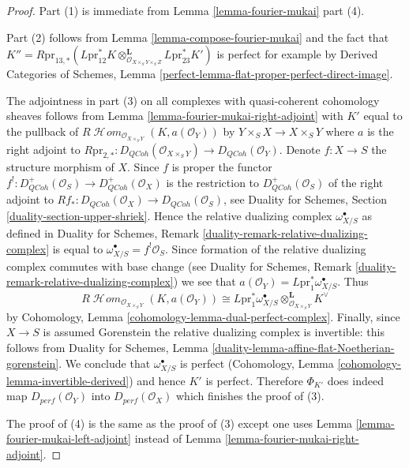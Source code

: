 \documentclass{stacks-project}
\theoremstyle{plain}
\theoremstyle{definition}
\theoremstyle{remark}
\numberwithin{equation}{subsection}
\def\SheafHom{\mathop{\mathcal{H}\!\mathit{om}}\nolimits}
\def\QCoh{\mathit{QCoh}}
\begin{document}
\begin{proof}
Part (1) is immediate from Lemma \ref{lemma-fourier-mukai} part (4).

\medskip\noindent
Part (2) follows from Lemma \ref{lemma-compose-fourier-mukai} and the
fact that
$K'' = R\text{pr}_{13, *}(
L\text{pr}_{12}^*K
\otimes_{\mathcal{O}_{X \times_S Y \times_S Z}}^\mathbf{L}
L\text{pr}_{23}^*K')$ is perfect for example by
Derived Categories of Schemes, Lemma
\ref{perfect-lemma-flat-proper-perfect-direct-image}.

\medskip\noindent
The adjointness in part (3) on all complexes with quasi-coherent cohomology
sheaves follows from Lemma \ref{lemma-fourier-mukai-right-adjoint} with
$K'$ equal to the pullback of
$R\SheafHom_{\mathcal{O}_{X \times_S Y}}(K, a(\mathcal{O}_Y))$
by $Y \times_S X \to X \times_S Y$ where $a$ is the right adjoint
to $R\text{pr}_{2, *} : D_\QCoh(\mathcal{O}_{X \times_S Y}) \to
D_\QCoh(\mathcal{O}_Y)$. Denote $f : X \to S$ the structure morphism of $X$.
Since $f$ is proper the functor
$f^! : D_\QCoh^+(\mathcal{O}_S) \to D_\QCoh^+(\mathcal{O}_X)$
is the restriction to $D_\QCoh^+(\mathcal{O}_S)$
of the right adjoint to
$Rf_* : D_\QCoh(\mathcal{O}_X) \to D_\QCoh(\mathcal{O}_S)$, see
Duality for Schemes, Section \ref{duality-section-upper-shriek}.
Hence the relative dualizing complex $\omega_{X/S}^\bullet$ as defined in
Duality for Schemes, Remark
\ref{duality-remark-relative-dualizing-complex}
is equal to $\omega_{X/S}^\bullet = f^!\mathcal{O}_S$.
Since formation of the relative dualizing complex
commutes with base change (see Duality for Schemes, Remark
\ref{duality-remark-relative-dualizing-complex}) we see that
$a(\mathcal{O}_Y) = L\text{pr}_1^*\omega_{X/S}^\bullet$.
Thus
$$
R\SheafHom_{\mathcal{O}_{X \times_S Y}}(K, a(\mathcal{O}_Y))
\cong
L\text{pr}_1^*\omega_{X/S}^\bullet
\otimes_{\mathcal{O}_{X \times_S Y}}^\mathbf{L} K^\vee
$$
by Cohomology, Lemma \ref{cohomology-lemma-dual-perfect-complex}.
Finally, since $X \to S$ is assumed Gorenstein the relative dualizing complex
is invertible: this follows from Duality for Schemes, Lemma
\ref{duality-lemma-affine-flat-Noetherian-gorenstein}.
We conclude that $\omega_{X/S}^\bullet$ is perfect
(Cohomology, Lemma \ref{cohomology-lemma-invertible-derived})
and hence $K'$ is perfect.
Therefore $\Phi_{K'}$ does indeed map $D_{perf}(\mathcal{O}_Y)$
into $D_{perf}(\mathcal{O}_X)$ which finishes the proof of (3).

\medskip\noindent
The proof of (4) is the same as the proof of (3) except one uses
Lemma \ref{lemma-fourier-mukai-left-adjoint} instead of
Lemma \ref{lemma-fourier-mukai-right-adjoint}.
\end{proof}
\end{document}
